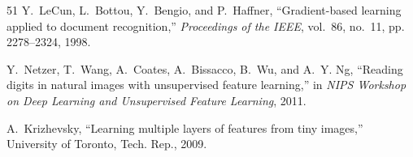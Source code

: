 \documentclass[journal]{IEEEtran}
\theoremstyle{definition}
\begin{document}
\begin{thebibliography}{51}
Y.~LeCun, L.~Bottou, Y.~Bengio, and P.~Haffner, ``Gradient-based learning
  applied to document recognition,'' \emph{Proceedings of the IEEE}, vol.~86,
  no.~11, pp. 2278--2324, 1998.

Y.~Netzer, T.~Wang, A.~Coates, A.~Bissacco, B.~Wu, and A.~Y. Ng, ``Reading
  digits in natural images with unsupervised feature learning,'' in \emph{NIPS
  Workshop on Deep Learning and Unsupervised Feature Learning}, 2011.

A.~Krizhevsky, ``Learning multiple layers of features from tiny images,''
  University of Toronto, Tech. Rep., 2009.

\end{thebibliography}
\end{document}
